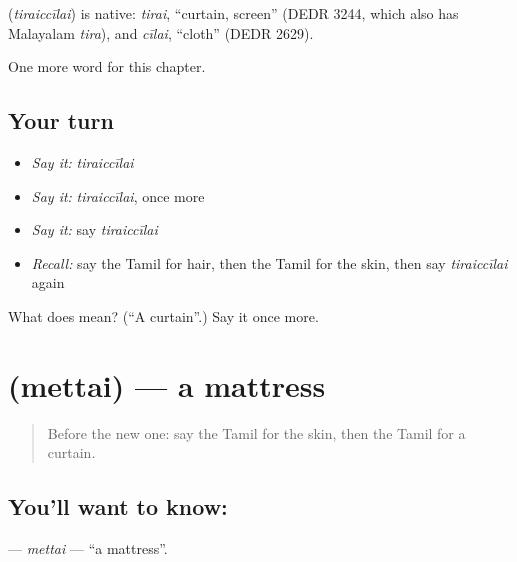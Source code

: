 \begin{cousinweb}
\textbf{} (\emph{tiraiccīlai}) is native: \emph{tirai}, \textquotedblleft{}curtain, screen\textquotedblright{} (DEDR 3244, which also has Malayalam \emph{tira}), and \emph{cīlai}, \textquotedblleft{}cloth\textquotedblright{} (DEDR 2629).
\end{cousinweb}

\begin{grammarlens}[title={What you've built}]
One more word for this chapter.
\end{grammarlens}

\subsection*{Your turn}
\begin{itemize}
\raggedright
  \item \emph{Say it:} \emph{tiraiccīlai}
  \item \emph{Say it:} \emph{tiraiccīlai}, once more
  \item \emph{Say it:} say \emph{tiraiccīlai}
  \item \emph{Recall:} say the Tamil for hair, then the Tamil for the skin, then say \emph{tiraiccīlai} again
\end{itemize}

\begin{tcolorbox}[breakable,colback=teal!4,colframe=teal!35!black,title={Before you move on}]
What does  mean? (\textquotedblleft{}A curtain\textquotedblright{}.) Say it once more.
\end{tcolorbox}
\section[\texorpdfstring{\ta{மெத்தை} (mettai)}{மெத்தை (mettai)}]{ (mettai) — a mattress}

\label{lesson:TA-C134-mettai}



\begin{quote}
Before the new one: say the Tamil for the skin, then the Tamil for a curtain.
\end{quote}

\subsection*{You'll want to know: }
\textbf{} — \emph{mettai} — \textquotedblleft{}a mattress\textquotedblright{}.

